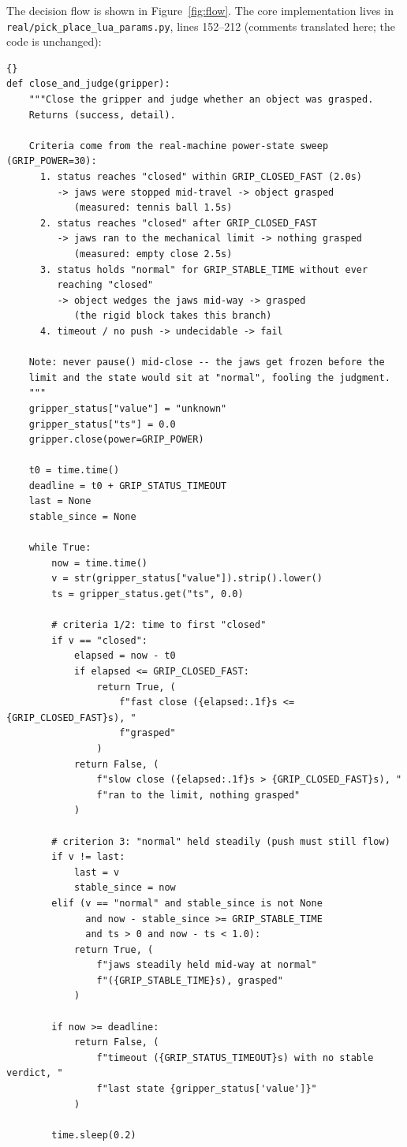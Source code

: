\documentclass[11pt,a4paper]{ctexart}
\begin{document}
The decision flow is shown in Figure~\ref{fig:flow}. The core
implementation lives in \texttt{real/pick\_place\_lua\_params.py}, lines
152--212 (comments translated here; the code is unchanged):

\begin{lstlisting}[firstline=152,lastline=212]{}
def close_and_judge(gripper):
    """Close the gripper and judge whether an object was grasped.
    Returns (success, detail).

    Criteria come from the real-machine power-state sweep (GRIP_POWER=30):
      1. status reaches "closed" within GRIP_CLOSED_FAST (2.0s)
         -> jaws were stopped mid-travel -> object grasped
            (measured: tennis ball 1.5s)
      2. status reaches "closed" after GRIP_CLOSED_FAST
         -> jaws ran to the mechanical limit -> nothing grasped
            (measured: empty close 2.5s)
      3. status holds "normal" for GRIP_STABLE_TIME without ever
         reaching "closed"
         -> object wedges the jaws mid-way -> grasped
            (the rigid block takes this branch)
      4. timeout / no push -> undecidable -> fail

    Note: never pause() mid-close -- the jaws get frozen before the
    limit and the state would sit at "normal", fooling the judgment.
    """
    gripper_status["value"] = "unknown"
    gripper_status["ts"] = 0.0
    gripper.close(power=GRIP_POWER)

    t0 = time.time()
    deadline = t0 + GRIP_STATUS_TIMEOUT
    last = None
    stable_since = None

    while True:
        now = time.time()
        v = str(gripper_status["value"]).strip().lower()
        ts = gripper_status.get("ts", 0.0)

        # criteria 1/2: time to first "closed"
        if v == "closed":
            elapsed = now - t0
            if elapsed <= GRIP_CLOSED_FAST:
                return True, (
                    f"fast close ({elapsed:.1f}s <= {GRIP_CLOSED_FAST}s), "
                    f"grasped"
                )
            return False, (
                f"slow close ({elapsed:.1f}s > {GRIP_CLOSED_FAST}s), "
                f"ran to the limit, nothing grasped"
            )

        # criterion 3: "normal" held steadily (push must still flow)
        if v != last:
            last = v
            stable_since = now
        elif (v == "normal" and stable_since is not None
              and now - stable_since >= GRIP_STABLE_TIME
              and ts > 0 and now - ts < 1.0):
            return True, (
                f"jaws steadily held mid-way at normal"
                f"({GRIP_STABLE_TIME}s), grasped"
            )

        if now >= deadline:
            return False, (
                f"timeout ({GRIP_STATUS_TIMEOUT}s) with no stable verdict, "
                f"last state {gripper_status['value']}"
            )

        time.sleep(0.2)
\end{lstlisting}
\end{document}
